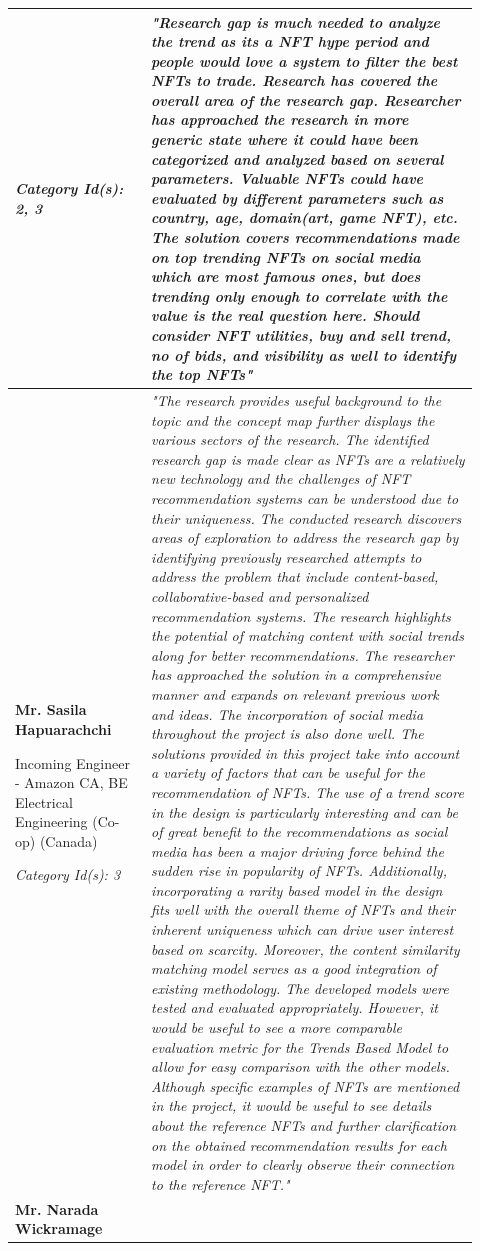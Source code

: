 \begin{longtable}{|p{0.27\linewidth}|p{0.655\linewidth}|}
\textit{Category Id(s): 2, 3}
 &
 \textit{"Research gap is much needed to analyze the trend as its a NFT hype period and people would love a system to filter the best NFTs to trade. Research has covered the overall area of the research gap. Researcher has approached the research in more generic state where it could have been categorized and analyzed based on several parameters. Valuable NFTs could have evaluated by different parameters such as country, age, domain(art, game NFT), etc. The solution covers recommendations made on top trending NFTs on social media which are most famous ones, but does trending only enough to correlate with the value is the real question here. Should consider NFT utilities, buy and sell trend, no of bids, and visibility as well to identify the top NFTs"}
 \\
\hline
\textbf{Mr. Sasila Hapuarachchi}

 Incoming Engineer - Amazon CA,
 BE Electrical Engineering (Co-op) (Canada)

\textit{Category Id(s): 3}
 & 
 \textit{"The research provides useful background to the topic and the concept map further displays the various sectors of the research. The identified research gap is made clear as NFTs are a relatively new technology and the challenges of NFT recommendation systems can be understood due to their uniqueness. 
 The conducted research discovers areas of exploration to address the research gap by identifying previously researched attempts to address the problem that include content-based, collaborative-based and personalized recommendation systems. The research highlights the potential of matching content with social trends along for better recommendations. 
 The researcher has approached the solution in a comprehensive manner and expands on relevant previous work and ideas. The incorporation of social media throughout the project is also done well.
 The solutions provided in this project take into account a variety of factors that can be useful for the recommendation of NFTs. The use of a trend score in the design is particularly interesting and can be of great benefit to the recommendations as social media has been a major driving force behind the sudden rise in popularity of NFTs. Additionally, incorporating a rarity based model in the design fits well with the overall theme of NFTs and their inherent uniqueness which can drive user interest based on scarcity. Moreover, the content similarity matching model serves as a good integration of existing methodology.
 The developed models were tested and evaluated appropriately. However, it would be useful to see a more comparable evaluation metric for the Trends Based Model to allow for easy comparison with the other models.
 Although specific examples of NFTs are mentioned in the project, it would be useful to see details about the reference NFTs and further clarification on the obtained recommendation results for each model in order to clearly observe their connection to the reference NFT."}
 \\
 \hline
\textbf{Mr. Narada Wickramage}


\end{longtable}
